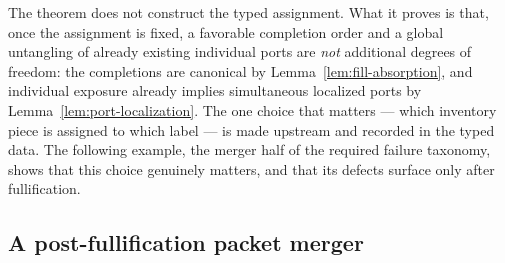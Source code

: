 The theorem does not construct the typed assignment. What it proves is that, once
the assignment is fixed, a favorable completion order and a global untangling of
already existing individual ports are \emph{not} additional degrees of freedom: the
completions are canonical by Lemma~\ref{lem:fill-absorption}, and individual
exposure already implies simultaneous localized ports by
Lemma~\ref{lem:port-localization}. The one choice that matters --- which inventory
piece is assigned to which label --- is made upstream and recorded in the typed
data. The following example, the merger half of the required failure taxonomy, shows
that this choice genuinely matters, and that its defects surface only after
fullification.

\subsection{A post-fullification packet merger}\label{subsec:E-merger}

